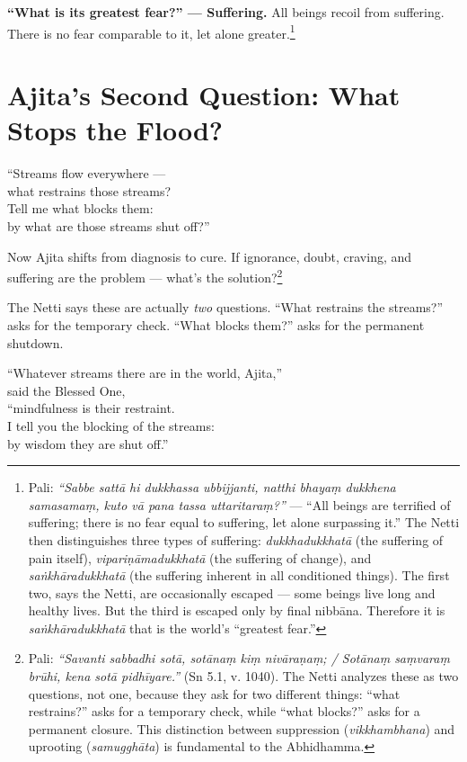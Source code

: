 \textbf{``What is its greatest fear?'' --- Suffering.} All beings recoil from suffering. There is no fear comparable to it, let alone greater.\footnote{Pali: \textit{``Sabbe sattā hi dukkhassa ubbijjanti, natthi bhayaṃ dukkhena samasamaṃ, kuto vā pana tassa uttaritaraṃ?''} --- ``All beings are terrified of suffering; there is no fear equal to suffering, let alone surpassing it.'' The Netti then distinguishes three types of suffering: \textit{dukkhadukkhatā} (the suffering of pain itself), \textit{vipariṇāmadukkhatā} (the suffering of change), and \textit{saṅkhāradukkhatā} (the suffering inherent in all conditioned things). The first two, says the Netti, are occasionally escaped --- some beings live long and healthy lives. But the third is escaped only by final nibbāna. Therefore it is \textit{saṅkhāradukkhatā} that is the world's ``greatest fear.''}

\section*{Ajita's Second Question: What Stops the Flood?}

\begin{versebox}
``Streams flow everywhere ---\\
what restrains those streams?\\
Tell me what blocks them:\\
by what are those streams shut off?''
\end{versebox}

Now Ajita shifts from diagnosis to cure. If ignorance, doubt, craving, and suffering are the problem --- what's the solution?\footnote{Pali: \textit{``Savanti sabbadhi sotā, sotānaṃ kiṃ nivāraṇaṃ; / Sotānaṃ saṃvaraṃ brūhi, kena sotā pidhīyare.''} (Sn 5.1, v. 1040). The Netti analyzes these as two questions, not one, because they ask for two different things: ``what restrains?'' asks for a temporary check, while ``what blocks?'' asks for a permanent closure. This distinction between suppression (\textit{vikkhambhana}) and uprooting (\textit{samugghāta}) is fundamental to the Abhidhamma.}

The Netti says these are actually \textit{two} questions. ``What restrains the streams?'' asks for the temporary check. ``What blocks them?'' asks for the permanent shutdown.

\begin{versebox}
``Whatever streams there are in the world, Ajita,''\\
said the Blessed One,\\
``mindfulness is their restraint.\\
I tell you the blocking of the streams:\\
by wisdom they are shut off.''
\end{versebox}

